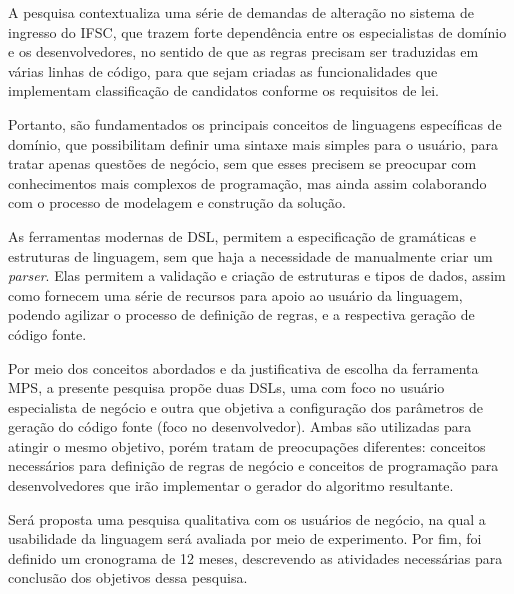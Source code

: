 A pesquisa contextualiza uma série de demandas de alteração no sistema de ingresso do \gls{IFSC}, que trazem forte dependência entre os especialistas de domínio e os desenvolvedores, no sentido de que as regras precisam ser traduzidas em várias linhas de código, para que sejam criadas as funcionalidades que implementam classificação de candidatos conforme os requisitos de lei.

Portanto, são fundamentados os principais conceitos de linguagens específicas de domínio, que possibilitam definir uma sintaxe mais simples para o usuário, para tratar apenas questões de negócio, sem que esses precisem se preocupar com conhecimentos mais complexos de programação, mas ainda assim colaborando com o processo de modelagem e construção da solução.

As ferramentas modernas de \gls{DSL}, permitem a especificação de gramáticas e estruturas de linguagem, sem que haja a necessidade de manualmente criar um \textit{parser}. Elas permitem a validação e criação de estruturas e tipos de dados, assim como fornecem uma série de recursos para apoio ao usuário da linguagem, podendo agilizar o processo de definição de regras, e a respectiva geração de código fonte.

Por meio dos conceitos abordados e da justificativa de escolha da ferramenta \gls{MPS}, a presente pesquisa propõe duas \gls{DSL}s, uma com foco no usuário especialista de negócio e outra que objetiva a configuração dos parâmetros de geração do código fonte (foco no desenvolvedor). Ambas são utilizadas para atingir o mesmo objetivo, porém tratam de preocupações diferentes: conceitos necessários para definição de regras de negócio e conceitos de programação para desenvolvedores que irão implementar o gerador do algoritmo resultante.

Será proposta uma pesquisa qualitativa com os usuários de negócio, na qual a usabilidade da linguagem será avaliada por meio de experimento. Por fim, foi definido um cronograma de 12 meses, descrevendo as atividades necessárias para conclusão dos objetivos dessa 
pesquisa.
